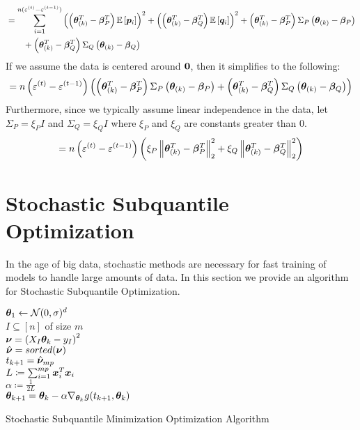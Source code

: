 \documentclass{article} %
\newcommand{\norm}[1]{\left\lVert#1\right\rVert}
\begin{document}
\begin{appendices}
\begin{align*}
		&= \sum_{i=1}^{n(\varepsilon^{(t)} - \varepsilon^{(t-1)})} \left(\left({\bm{\theta}}_{(k)}^T - {\bm{\beta}}_P^T\right)\mathbb{E}\left[{\bm{p}}_i\right]\right)^2 + \left(\left({\bm{\theta}}_{(k)}^T - {\bm{\beta}}_Q^T\right)\mathbb{E}\left[{\bm{q}}_i\right]\right)^2 + \left({\bm{\theta}}_{(k)}^T - {\bm{\beta}}_P^T\right)\Sigma_P\left({\bm{\theta}}_{(k)} - {\bm{\beta}}_P\right) \notag\\ &\qquad+ \left({\bm{\theta}}_{(k)}^T - {\bm{\beta}}_Q^T\right)\Sigma_Q\left({\bm{\theta}}_{(k)} - {\bm{\beta}}_Q\right)
	\end{align*}
	If we assume the data is centered around ${\bm{0}}$, then it simplifies to the following:
	\begin{equation}
		= n\left(\varepsilon^{(t)} - \varepsilon^{(t-1)}\right) \left(\left({\bm{\theta}}_{(k)}^T - {\bm{\beta}}_P^T\right)\Sigma_P\left({\bm{\theta}}_{(k)} - {\bm{\beta}}_P\right) + \left({\bm{\theta}}_{(k)}^T - {\bm{\beta}}_Q^T\right)\Sigma_Q\left({\bm{\theta}}_{(k)} - {\bm{\beta}}_Q\right)\right)
	\end{equation}
	Furthermore, since we typically assume linear independence in the data, let $\Sigma_P = \xi_P I$ and $\Sigma_Q = \xi_Q I$ where $\xi_P$ and $\xi_Q$ are constants greater than $0$.
	\begin{equation}
		= n\left(\varepsilon^{(t)} - \varepsilon^{(t-1)}\right) \left(\xi_P\norm{\vtheta_{(k)}^T - \vbeta_P^T}^2_2 + \xi_Q\norm{\vtheta_{(k)}^T - \vbeta_Q^T}^2_2\right)
	\end{equation}
	\newpage
	
	\section{Stochastic Subquantile Optimization}
	In the age of big data, stochastic methods are necessary for fast training of models to handle large amounts of data. In this section we provide an algorithm for Stochastic Subquantile Optimization.
	\begin{algorithm}[H]
		\DontPrintSemicolon
		
		${\bm{\theta}}_1 \gets \mathcal{N}(0,\sigma)^d$\\
		{
			$I \subseteq \left[n\right]$ of size $m$\\
			$\displaystyle {\bm{\nu}} = \left(X_I{\bm{\theta}}_k - y_I\right)^2$\\
			$\hat{{\bm{\nu}}} = sorted({\bm{\nu}})$\\
			$\displaystyle t_{k+1} = \hat{{\bm{\nu}}}_{mp}$\\
			$L \coloneqq \sum_{i=1}^{mp} {\bm{x}}_i^T{\bm{x}}_i$\\
			$\alpha \coloneqq \frac{1}{2L}$\\
			$\displaystyle {\bm{\theta}}_{k+1} = {\bm{\theta}}_k - \alpha \nabla_{{\bm{\theta}}_k}g(t_{k+1},{\bm{\theta}}_k)$
		}
		\caption{Stochastic Subquantile Minimization Optimization Algorithm}
		\label{alg:sqo-stochastic}
	\end{algorithm}
	

\end{appendices}
\end{document}
